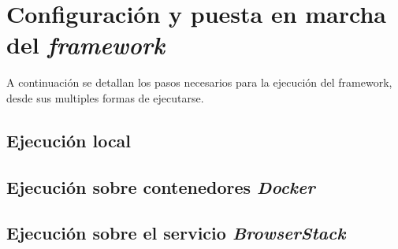 \chapter{Configuración y puesta en marcha del \emph{framework}}
A continuación se detallan los pasos necesarios para la ejecución del framework,
desde sus multiples formas de ejecutarse.

\section{Ejecución local}
\section{Ejecución sobre contenedores \emph{Docker}}
\section{Ejecución sobre el servicio \emph{BrowserStack}}

